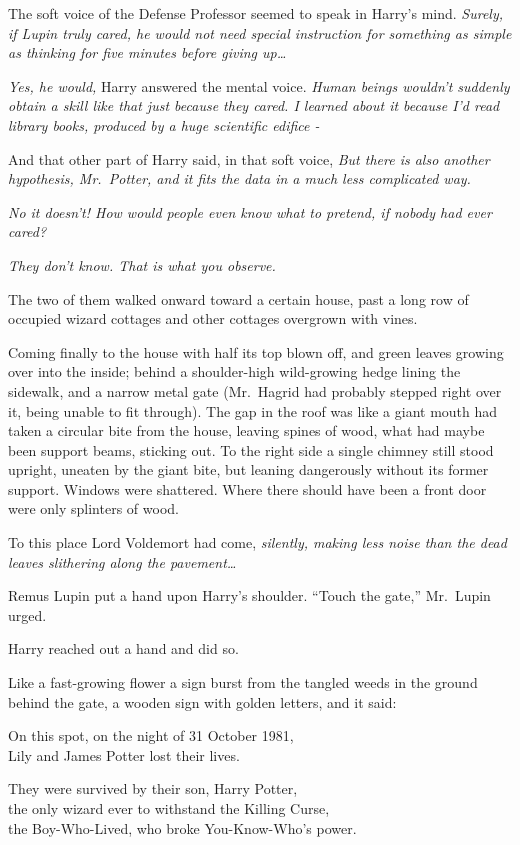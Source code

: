 The soft voice of the Defense Professor seemed to speak in Harry's mind.
\emph{Surely, if Lupin truly cared, he would not need special
instruction for something as simple as thinking for five minutes before
giving up\ldots{}}

\emph{Yes, he would,} Harry answered the mental voice. \emph{Human
beings wouldn't suddenly obtain a skill like that just because they
cared. I learned about it because I'd read library books, produced by a
huge scientific edifice -}

And that other part of Harry said, in that soft voice, \emph{But there
is also another hypothesis, Mr.~Potter, and it fits the data in a much
less complicated way.}

\emph{No it doesn't! How would people even know what to pretend, if
nobody had ever cared?}

\emph{They don't know. That is what you observe.}

The two of them walked onward toward a certain house, past a long row of
occupied wizard cottages and other cottages overgrown with vines.

Coming finally to the house with half its top blown off, and green
leaves growing over into the inside; behind a shoulder-high wild-growing
hedge lining the sidewalk, and a narrow metal gate (Mr.~Hagrid had
probably stepped right over it, being unable to fit through). The gap in
the roof was like a giant mouth had taken a circular bite from the
house, leaving spines of wood, what had maybe been support beams,
sticking out. To the right side a single chimney still stood upright,
uneaten by the giant bite, but leaning dangerously without its former
support. Windows were shattered. Where there should have been a front
door were only splinters of wood.

To this place Lord Voldemort had come, \emph{silently, making less noise
than the dead leaves slithering along the pavement\ldots{}}

Remus Lupin put a hand upon Harry's shoulder. ``Touch the gate,''
Mr.~Lupin urged.

Harry reached out a hand and did so.

Like a fast-growing flower a sign burst from the tangled weeds in the
ground behind the gate, a wooden sign with golden letters, and it said:

On this spot, on the night of 31 October 1981,\\ Lily and James Potter
lost their lives.

They were survived by their son, Harry Potter,\\ the only wizard ever to
withstand the Killing Curse,\\ the Boy-Who-Lived, who broke
You-Know-Who's power.

